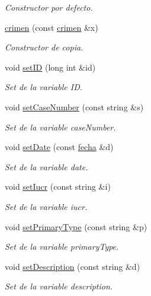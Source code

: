 \begin{DoxyCompactItemize}
\begin{DoxyCompactList}\small\item\em Constructor por defecto. \end{DoxyCompactList}\item 
\hyperlink{classcrimen_a50b783e821c2f5bc829eceb9048c12d7}{crimen} (const \hyperlink{classcrimen}{crimen} \&x)
\begin{DoxyCompactList}\small\item\em Constructor de copia. \end{DoxyCompactList}\item 
void \hyperlink{classcrimen_a2675734f5049f41b5fb5dbc4778df7f8}{set\-I\-D} (long int \&id)
\begin{DoxyCompactList}\small\item\em Set de la variable I\-D. \end{DoxyCompactList}\item 
void \hyperlink{classcrimen_a98ee8c42a0ec09c704c5f17e812a6bd5}{set\-Case\-Number} (const string \&s)
\begin{DoxyCompactList}\small\item\em Set de la variable case\-Number. \end{DoxyCompactList}\item 
void \hyperlink{classcrimen_ac308c139bb8b599a7badbecd91bfbc5a}{set\-Date} (const \hyperlink{classfecha}{fecha} \&d)
\begin{DoxyCompactList}\small\item\em Set de la variable date. \end{DoxyCompactList}\item 
void \hyperlink{classcrimen_ab51525fd95906f7d0980962c94f7abdb}{set\-Iucr} (const string \&i)
\begin{DoxyCompactList}\small\item\em Set de la variable iucr. \end{DoxyCompactList}\item 
void \hyperlink{classcrimen_a65ea5319dcfe53ed312aa5edbbc5870d}{set\-Primary\-Type} (const string \&p)
\begin{DoxyCompactList}\small\item\em Set de la variable primary\-Type. \end{DoxyCompactList}\item 
void \hyperlink{classcrimen_a97c51e9c38e2a9ab2863e2e17788dc40}{set\-Description} (const string \&d)
\begin{DoxyCompactList}\small\item\em Set de la variable description. \end{DoxyCompactList}\item 

\end{DoxyCompactItemize}
